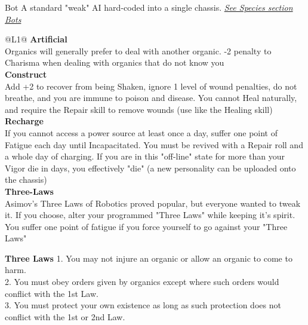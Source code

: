 \begin{genericsection}{Bot}
  A standard "weak" AI hard-coded into a single chassis. \textit{\hyperref[sec:specie-bots]{See Species section Bots}}
\end{genericsection}
\begin{redtable}{\linewidth}{@{}L{1}@{}}
  \textbf{Artificial}\\
  Organics will generally prefer to deal with another organic. -2 penalty to Charisma when dealing with organics that do not know you\\
  \textbf{Construct}\\
  Add +2 to recover from being Shaken, ignore 1 level of wound penalties, do not breathe, and you are immune to poison and disease. You cannot Heal naturally, and require the Repair skill to remove wounds (use like the Healing skill)\\
  \textbf{Recharge}\\
  If you cannot access a power source at least once a day, suffer one point of Fatigue each day until Incapacitated. You must be revived with a Repair roll and a whole day of charging. If you are in this "off-line" state for more than your Vigor die in days, you effectively "die" (a new personality can be uploaded onto the chassis)\\
  \textbf{Three-Laws}\\
  Asimov's Three Laws of Robotics proved popular, but everyone wanted to tweak it. If you choose, alter your programmed "Three Laws" while keeping it's spirit. You suffer one point of fatigue if you force yourself to go against your "Three Laws"
\end{redtable}

\begin{commentbox}{\textbf{Three Laws}}
1. You may not injure an organic or allow an organic to come to harm.\\
2. You must obey orders given by organics except where such orders would conflict with the 1st Law.\\
3. You must protect your own existence as long as such protection does not conflict with the 1st or 2nd Law.
\end{commentbox}
  

